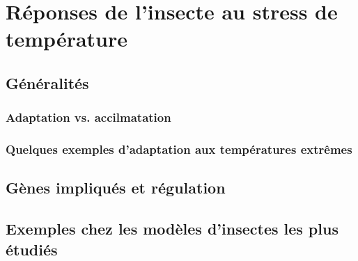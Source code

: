 \chapter{Réponses de l’insecte au stress de température} %
\label{chap:repstress}
	
	\section{Généralités} %
	\label{sec:g_n_ralit_s}
		

		\subsection{Adaptation vs. accilmatation} %
		\label{sub:adaptation_vs_accilmatation}
			

		\subsection{Quelques exemples d’adaptation aux températures extrêmes} %
		\label{sub:exemples_adaptations}
			

	\section{Gènes impliqués et régulation} %
	\label{sec:genes}
		

	\section{Exemples chez les modèles d'insectes les plus étudiés} %
	\label{sec:exemples_modeles}
		


